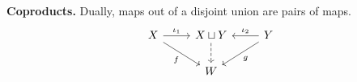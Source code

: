 \documentclass[11pt]{article}
\newenvironment{note}{%
  \def\FrameCommand{\fboxsep=4pt\fcolorbox{gray}{white}}%
  \MakeFramed{\advance\hsize-\width \FrameRestore}}%
  {\endMakeFramed}
\begin{document}
\begin{note}
\textbf{Coproducts.} Dually, maps out of a disjoint union are pairs of maps.
\[
\begin{tikzcd}
X \arrow[r, "\iota_1"] \arrow[dr, "f"'] & X \sqcup Y \arrow[d, dashed] & Y \arrow[l, "\iota_2"'] \arrow[dl, "g"] \\
& W &
\end{tikzcd}
\]
\end{note}
\end{document}
